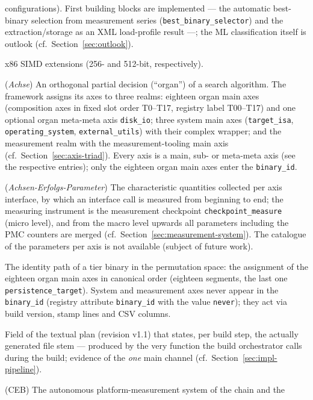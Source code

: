 \begin{description}
  configurations). First building blocks are implemented --- the automatic best-binary selection
  from measurement series (\texttt{best\_binary\_selector}) and the extraction/storage as an XML
  load-profile result ---; the ML classification itself is outlook (cf.\ Section~\ref{sec:outlook}).
  \item[AVX, AVX-512] x86 SIMD extensions (256- and 512-bit, respectively).
  \item[Axis] (\emph{Achse}) An orthogonal partial decision (\enquote{organ}) of a search
  algorithm. The framework assigns its axes to three realms: eighteen organ main axes
  (composition axes in fixed slot order T0--T17, registry label T00--T17) and one optional organ
  meta-meta axis \texttt{disk\_io}; three system main axes (\texttt{target\_isa},
  \texttt{operating\_system}, \texttt{external\_utils}) with their complex wrapper; and the
  measurement realm with the measurement-tooling main axis (cf.\ Section~\ref{sec:axis-triad}).
  Every axis is a main, sub- or meta-meta axis (see the respective entries); only the eighteen
  organ main axes enter the \texttt{binary\_id}.
  \item[Axis success parameter] (\emph{Achsen-Erfolgs-Parameter}) The characteristic quantities
  collected per axis interface, by which an interface call is measured from beginning to end; the
  measuring instrument is the measurement checkpoint \texttt{checkpoint\_measure} (micro level),
  and from the macro level upwards all parameters including the PMC counters are merged
  (cf.\ Section~\ref{sec:measurement-system}). The catalogue of the parameters per axis is not
  available (subject of future work).
  \item[binary\_id] The identity path of a tier binary in the permutation space: the assignment of
  the eighteen organ main axes in canonical order (eighteen segments, the last one
  \texttt{persistence\_target}). System and measurement axes never appear in the
  \texttt{binary\_id} (registry attribute \texttt{binary\_id} with the value \texttt{never}); they
  act via build version, stamp lines and CSV columns.
  \item[built\_stem] Field of the textual plan (revision v1.1) that states, per build step, the
  actually generated file stem --- produced by the very function the build orchestrator calls during
  the build; evidence of the \emph{one} main channel (cf.\ Section~\ref{sec:impl-pipeline}).
  \item[CacheEngineBuilder] (CEB) The autonomous platform-measurement system of the chain and the

\end{description}
